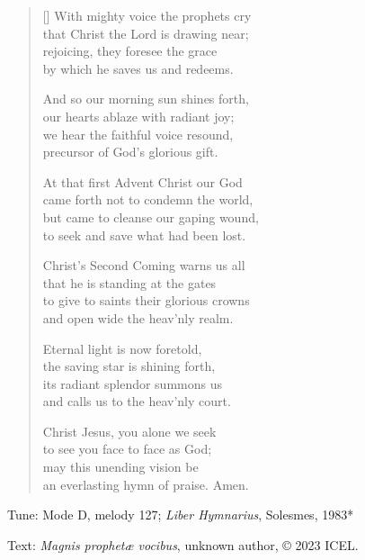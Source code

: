 \hymn

\settowidth{\versewidth}{to give to saints their glorious crowns}

\begin{verse}[\versewidth]
With mighty voice the prophets cry\\
that Christ the Lord is drawing near;\\
rejoicing, they foresee the grace\\
by which he saves us and redeems.

And so our morning sun shines forth,\\
our hearts ablaze with radiant joy;\\
we hear the faithful voice resound,\\
precursor of God’s glorious gift.

At that first Advent Christ our God\\
came forth not to condemn the world,\\
but came to cleanse our gaping wound,\\
to seek and save what had been lost.

Christ’s Second Coming warns us all\\
that he is standing at the gates\\
to give to saints their glorious crowns\\
and open wide the heav’nly realm.

Eternal light is now foretold,\\
the saving star is shining forth,\\
its radiant splendor summons us\\
and calls us to the heav’nly court.

Christ Jesus, you alone we seek\\
to see you face to face as God;\\
may this unending vision be\\
an everlasting hymn of praise. Amen.
\end{verse}

\begin{hymnsource}
Tune: Mode D, melody 127; \emph{Liber Hymnarius}, Solesmes, 1983*

Text: \emph{Magnis prophetæ vocibus}, unknown author, © 2023 ICEL.
\end{hymnsource}